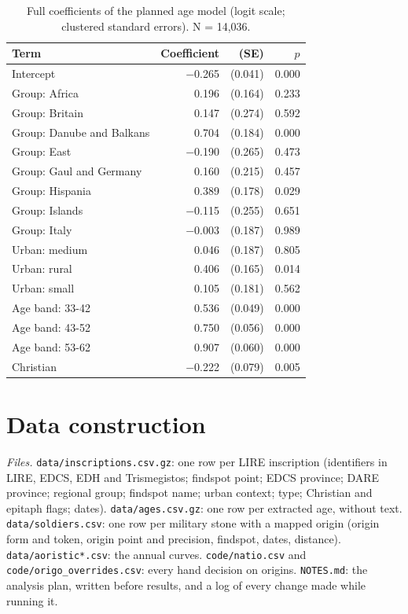 \documentclass[11pt,a4paper]{article}
\begin{document}
\begin{table}[tbp]\centering\footnotesize\caption{Full coefficients of the planned age model (logit scale; clustered standard errors). N = 14,036.}\label{tab:modelfull}\begin{tabular}{lrrr}\toprule Term & Coefficient & (SE) & $p$\\\midrule
Intercept & $-$0.265 & (0.041) & 0.000\\
Group: Africa & 0.196 & (0.164) & 0.233\\
Group: Britain & 0.147 & (0.274) & 0.592\\
Group: Danube and Balkans & 0.704 & (0.184) & 0.000\\
Group: East & $-$0.190 & (0.265) & 0.473\\
Group: Gaul and Germany & 0.160 & (0.215) & 0.457\\
Group: Hispania & 0.389 & (0.178) & 0.029\\
Group: Islands & $-$0.115 & (0.255) & 0.651\\
Group: Italy & $-$0.003 & (0.187) & 0.989\\
Urban: medium & 0.046 & (0.187) & 0.805\\
Urban: rural & 0.406 & (0.165) & 0.014\\
Urban: small & 0.105 & (0.181) & 0.562\\
Age band: 33-42 & 0.536 & (0.049) & 0.000\\
Age band: 43-52 & 0.750 & (0.056) & 0.000\\
Age band: 53-62 & 0.907 & (0.060) & 0.000\\
Christian & $-$0.222 & (0.079) & 0.005\\
\bottomrule\end{tabular}\end{table}

\section{Data construction}
\textit{Files.} \texttt{data/inscriptions.csv.gz}: one row per LIRE inscription (identifiers in LIRE, EDCS, EDH and Trismegistos; findspot point; EDCS province; DARE province; regional group; findspot name; urban context; type; Christian and epitaph flags; dates). \texttt{data/ages.csv.gz}: one row per extracted age, without text. \texttt{data/soldiers.csv}: one row per military stone with a mapped origin (origin form and token, origin point and precision, findspot, dates, distance). \texttt{data/aoristic*.csv}: the annual curves. \texttt{code/natio.csv} and \texttt{code/origo\_overrides.csv}: every hand decision on origins. \texttt{NOTES.md}: the analysis plan, written before results, and a log of every change made while running it.
\end{document}
